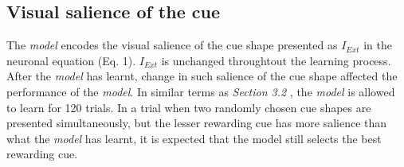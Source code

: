 \documentclass[11pt]{article}
\begin{document}
\subsection{Visual salience of the cue}
The \emph{model} encodes the visual salience of the cue shape presented as $I_{Ext}$ in the neuronal equation (Eq. 1). $I_{Ext}$ is unchanged throughtout the learning process. After the \emph{model} has learnt, change in such salience of the cue shape affected the performance of the \emph{model}. In similar terms as \emph{Section 3.2} , the \emph{model} is allowed to learn for 120 trials. In a trial when two randomly chosen cue shapes are presented simultaneously, but the lesser rewarding cue has more salience than what the \emph{model} has learnt, it is expected that the model still selects the best rewarding cue.\par
\end{document}

